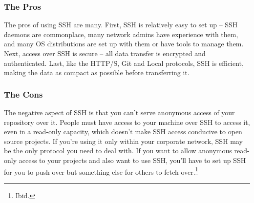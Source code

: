 \documentclass[12pt,letterpaper,dvips]{article}
\begin{document}
\subsubsection{The Pros}
The pros of using SSH are many.  First, SSH is relatively easy
to set up – SSH daemons are commonplace, many network admins have
experience with them, and many OS distributions are set up with
them or have tools to manage them.  Next, access over SSH is
secure – all data transfer is encrypted and authenticated.  Last,
like the HTTP/S, Git and Local protocols, SSH is efficient, making
the data as compact as possible before transferring it.


\subsubsection{The Cons}
The negative aspect of SSH is that you can’t serve anonymous
access of your repository over it.  People must have access to
your machine over SSH to access it, even in a read-only capacity,
which doesn’t make SSH access conducive to open source projects.
If you’re using it only within your corporate network, SSH may be
the only protocol you need to deal with.  If you want to allow
anonymous read-only access to your projects and also want to use
SSH, you’ll have to set up SSH for you to push over but something
else for others to fetch over.\footnote{Ibid.}









\end{document}

